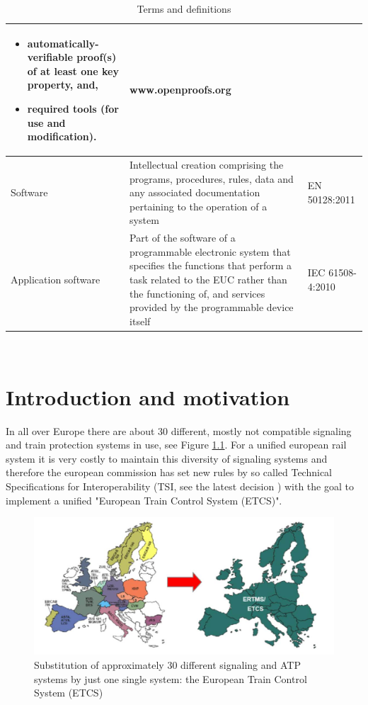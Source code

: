 \documentclass{template/openetcs_report}
\begin{document}
\begin{table} [h]
\begin{tabular}{|p{2cm}|p{9cm}|p{3cm}|}
\begin{itemize}
\item automatically-verifiable proof(s) of at least one key property, and,
\item required tools (for use and modification).
\end{itemize} & www.openproofs.org \\ 
\hline
Software & Intellectual creation comprising the programs, procedures, rules, data and any associated documentation pertaining to the operation of a system & EN 50128:2011 \\ 
\hline
Application software & Part of the software of a programmable electronic system that specifies the functions that perform a task related to the EUC rather than the functioning of, and services provided by the programmable device itself & IEC 61508-4:2010 \\ 
\hline
\end{tabular}
\\
\caption{Terms and definitions}
\end{table}


\chapter{Introduction and motivation}
In all over Europe there are about 30 different, mostly not compatible signaling and train protection systems in use, see Figure \ref{fig:openETCS2}. For a unified european rail system it is very costly to maintain this diversity of signaling systems and therefore the european commission has set new rules by so called Technical Specifications for Interoperability (TSI, see the latest decision \cite{TSI-doc}) with the goal to implement a unified "European Train Control System (ETCS)".


\begin{figure}
\centering
\includegraphics[width=12cm]{openETCS2}
\caption{Substitution of approximately 30 different signaling and ATP systems by just one single system: the European Train Control System (ETCS)}
\label{fig:openETCS2}
\end{figure}
\end{document}
